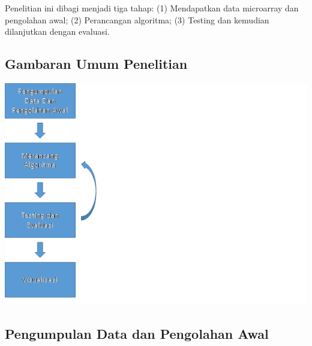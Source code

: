 \chapter{\babTiga}
Penelitian ini dibagi menjadi tiga tahap: (1) Mendapatkan data microarray dan pengolahan awal; (2) Perancangan algoritma; (3) Testing dan kemudian dilanjutkan dengan evaluasi.


\section{Gambaran Umum Penelitian}

\includegraphics[scale=1]{pics/gbr3_1.png} 


\section{Pengumpulan Data dan Pengolahan Awal}




